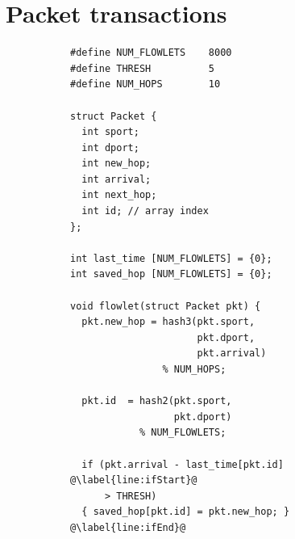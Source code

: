 \section{Packet transactions}
\label{s:transactions}

\begin{figure}[!t]
\begin{subfigure}{0.5\textwidth}
\begin{small}
\begin{lstlisting}[style=customc]
#define NUM_FLOWLETS    8000
#define THRESH          5
#define NUM_HOPS        10

struct Packet {
  int sport;
  int dport;
  int new_hop;
  int arrival;
  int next_hop;
  int id; // array index
};

int last_time [NUM_FLOWLETS] = {0};
int saved_hop [NUM_FLOWLETS] = {0};

void flowlet(struct Packet pkt) {
  pkt.new_hop = hash3(pkt.sport,
                      pkt.dport,
                      pkt.arrival)
                % NUM_HOPS;

  pkt.id  = hash2(pkt.sport,
                  pkt.dport)
            % NUM_FLOWLETS;

  if (pkt.arrival - last_time[pkt.id] @\label{line:ifStart}@
      > THRESH)
  { saved_hop[pkt.id] = pkt.new_hop; } @\label{line:ifEnd}@


\end{lstlisting}
\end{small}
\end{subfigure}
\end{figure}
